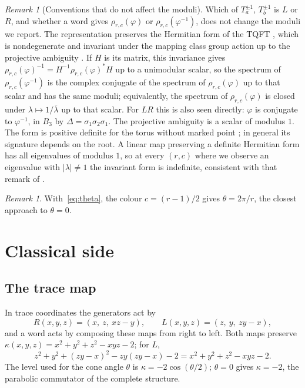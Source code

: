 \documentclass[11pt]{amsart}
\theoremstyle{definition}
\theoremstyle{remark}
\newtheorem{remark}[conjecture]{Remark}
\begin{document}
\begin{remark}[Conventions that do not affect the moduli]\label{rem:conventions}
Which of $T_a^{\pm1}$, $T_b^{\pm1}$ is $L$ or $R$, and whether a word gives
$\rho_{r,c}(\varphi)$ or $\rho_{r,c}(\varphi^{-1})$, does not change the moduli we
report. The representation preserves the Hermitian form of the TQFT
\cite[Thm.~2.1(1)]{DK}, which is nondegenerate and invariant under the mapping class
group action up to the projective ambiguity \cite{BHMV}. If $H$ is its matrix, this
invariance gives $\rho_{r,c}(\varphi)^{-1} = H^{-1}\rho_{r,c}(\varphi)^*H$ up to a
unimodular scalar, so the spectrum of $\rho_{r,c}(\varphi^{-1})$ is the complex
conjugate of the spectrum of $\rho_{r,c}(\varphi)$ up to that scalar and has the same
moduli; equivalently, the spectrum of $\rho_{r,c}(\varphi)$ is closed under
$\lambda \mapsto 1/\bar\lambda$ up to that scalar. For $LR$ this is also seen
directly: $\varphi$ is conjugate to $\varphi^{-1}$, in $B_3$ by
$\Delta = \sigma_1\sigma_2\sigma_1$. The projective ambiguity is a scalar of modulus
$1$. The form is positive definite for the torus without marked point
\cite[4.12]{BHMV}; in general its signature depends on the root. A linear map
preserving a definite Hermitian form has all eigenvalues of modulus $1$, so at every
$(r,c)$ where we observe an eigenvalue with $|\lambda| \ne 1$ the invariant form is
indefinite, consistent with that remark of \cite{BHMV}.
\end{remark}

\begin{remark}
With~\eqref{eq:theta}, the colour $c = (r-1)/2$ gives $\theta = 2\pi/r$, the closest
approach to $\theta = 0$.
\end{remark}

\section{Classical side}\label{sec:classical}

\subsection{The trace map}
In trace coordinates the generators act by
\[
R(x,y,z) = (x,\ z,\ xz - y), \qquad L(x,y,z) = (z,\ y,\ zy - x),
\]
and a word acts by composing these maps from right to left. Both maps preserve
$\kappa(x,y,z) = x^2+y^2+z^2-xyz-2$; for $L$,
\[
z^2 + y^2 + (zy-x)^2 - zy(zy-x) - 2 = x^2+y^2+z^2-xyz-2 .
\]
The level used for the cone angle $\theta$ is $\kappa = -2\cos(\theta/2)$;
$\theta = 0$ gives $\kappa = -2$, the parabolic commutator of the complete
structure.
\end{document}
